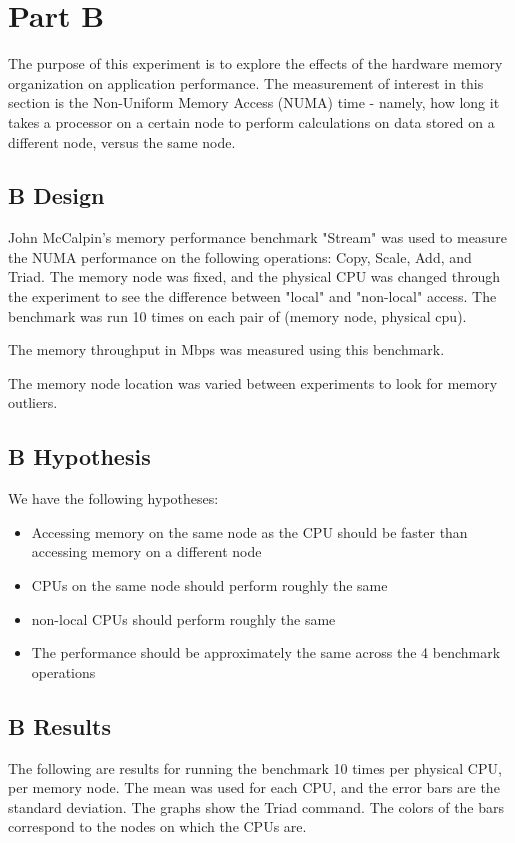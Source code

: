 \documentclass[a4paper, 12pt]{article}
\begin{document}
\section{Part B}
The purpose of this experiment is to explore the effects of the hardware memory organization on application performance. The measurement of interest in this section is the Non-Uniform Memory Access (NUMA) time - namely, how long it takes a processor on a certain node to perform calculations on data stored on a different node, versus the same node.

\subsection{B Design}
John McCalpin's memory performance benchmark "Stream" was used to measure the NUMA performance on the following operations: Copy, Scale, Add, and Triad. The memory node was fixed, and the physical CPU was changed through the experiment to see the difference between "local" and "non-local" access. The benchmark was run 10 times on each pair of (memory node, physical cpu).

The memory throughput in Mbps was measured using this benchmark.

The memory node location was varied between experiments to look for memory outliers.

\subsection{B Hypothesis}

We have the following hypotheses:

\begin{itemize}
\item	Accessing memory on the same node as the CPU should be faster than accessing memory on a different node
\item   CPUs on the same node should perform roughly the same
\item   non-local CPUs should perform roughly the same
\item   The performance should be approximately the same across the 4 benchmark operations
\end{itemize}

\subsection{B Results}

The following are results for running the benchmark 10 times per physical CPU, per memory node. The mean was used for each CPU, and the error bars are the standard deviation. The graphs show the Triad command. The colors of the bars correspond to the nodes on which the CPUs are.
\end{document}
